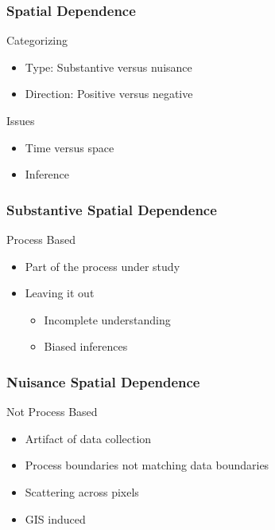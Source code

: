 \documentclass[nototal]{beamer}
\begin{document}
 \begin{frame}
   \frametitle{Spatial Dependence}
\begin{block}{Categorizing}
    \begin{itemize}
      \item Type: Substantive versus nuisance
      \item Direction: Positive versus negative
    \end{itemize}
  \end{block}

\begin{block}{Issues}
    \begin{itemize}
      \item Time versus space
      \item Inference
    \end{itemize}
  \end{block}
 \end{frame}

 \begin{frame}[<+->]
   \frametitle{Substantive Spatial Dependence}
   \begin{block}{Process Based}
     \begin{itemize}
       \item Part of the process under study
       \item Leaving it out
         \begin{itemize}
           \item Incomplete understanding
           \item Biased inferences
         \end{itemize}
     \end{itemize}
    \end{block}
  \end{frame}


 \begin{frame}[<+->]
   \frametitle{Nuisance Spatial Dependence}
   \begin{block}{Not Process Based}
     \begin{itemize}
       \item Artifact of data collection
       \item Process boundaries not matching data boundaries
       \item Scattering across pixels
       \item GIS induced
     \end{itemize}
    \end{block}
  \end{frame}
\end{document}
